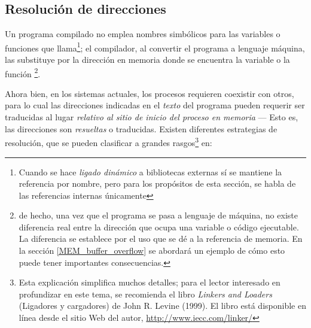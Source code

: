 \documentclass[11pt,fleqn]{book} %
\begin{document}
\subsection{Resolución de direcciones}
\label{sec-5-1-5}


Un programa compilado no emplea nombres simbólicos para las variables
o funciones que llama\footnote{Cuando se hace \emph{ligado dinámico} a
bibliotecas externas sí se mantiene la referencia por nombre, pero
para los propósitos de esta sección, se habla de las referencias
internas únicamente }; el compilador, al convertir el programa a
lenguaje máquina, las substituye por la dirección en memoria donde se
encuentra la variable o la función \footnote{de hecho, una vez que el programa
se pasa a lenguaje de máquina, no existe diferencia real entre la
dirección que ocupa una variable
o código ejecutable. La diferencia se establece por el uso que se dé a la
referencia de memoria. En la sección \ref{MEM_buffer_overflow} se
abordará un ejemplo de cómo esto puede tener importantes consecuencias. }.

Ahora bien, en los sistemas actuales, los procesos requieren coexistir
con otros, para lo cual las direcciones indicadas en el \emph{texto} del
programa pueden requerir ser traducidas al lugar \emph{relativo al sitio de inicio del proceso en memoria} — Esto es, las direcciones son
\emph{resueltas} o traducidas.  Existen diferentes estrategias de
resolución, que se pueden clasificar a grandes rasgos\footnote{Esta
explicación simplifica muchos detalles; para el lector interesado en
profundizar en este tema, se recomienda el libro \emph{Linkers and Loaders}
(Ligadores y cargadores) de John R. Levine (1999). El libro está
disponible en línea desde el sitio Web del autor,
\href{http://www.iecc.com/linker/}{http://www.iecc.com/linker/} } en:
\end{document}
